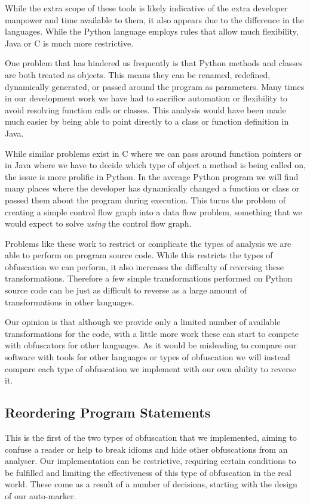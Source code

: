 \documentclass[twoside,a4paper]{report}
\begin{document}
While the extra scope of these tools is likely indicative of the extra developer manpower and time
available to them, it also appears due to the difference in the languages. While the Python language
employs rules that allow much flexibility, Java or C is much more restrictive.

One problem that has hindered us frequently is that Python methods and classes are both treated as objects.
This means they can be renamed, redefined, dynamically generated, or passed around the program as parameters.
Many times in our development work we have had to sacrifice automation or flexibility to avoid resolving function
calls or classes. This analysis would have been made much easier by being able to point directly to a class or
function definition in Java.

While similar problems exist in C where we can pass around function pointers or in Java where we have to decide which
type of object a method is being called on, the issue is more prolific in Python. In the average Python program we will
find many places where the developer has dynamically changed a function or class or passed them about the program during
execution. This turns the problem of creating a simple control flow graph into a data flow problem, something that we would
expect to solve \textit{using} the control flow graph.

Problems like these work to restrict or complicate the types of analysis we are able to perform on program source code.
While this restricts the types of obfuscation we can perform, it also increases the difficulty of reversing these
transformations. Therefore a few simple transformations performed on Python source code can be just as difficult to reverse as
a large amount of transformations in other languages.

Our opinion is that although we provide only a limited number of available transformations for the code, with a little more work
these can start to compete with obfuscators for other languages. As it would be misleading to compare our software with tools for
other languages or types of obfuscation we will instead compare each type of obfuscation we implement with our own ability to reverse
it.

\subsection{Reordering Program Statements}

This is the first of the two types of obfuscation that we implemented, aiming to confuse a reader or help to break idioms and hide
other obfuscations from an analyser. Our implementation can be restrictive, requiring certain conditions to be fulfilled and limiting
the effectiveness of this type of obfuscation in the real world. These come as a result of a number of decisions, starting with the
design of our auto-marker.
\end{document}
